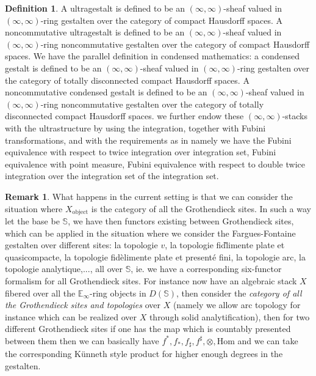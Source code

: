 \documentclass[12pt]{article}
\theoremstyle{definition}
\newtheorem{remark}{Remark}
\newtheorem{definition}{Definition}
\begin{document}
\begin{definition}
A ultragestalt is defined to be an $(\infty,\infty)$-sheaf valued in $(\infty,\infty)$-ring gestalten over the category of compact Hausdorff spaces. A noncommutative ultragestalt is defined to be an $(\infty,\infty)$-sheaf valued in $(\infty,\infty)$-ring noncommutative gestalten over the category of compact Hausdorff spaces. We have the parallel definition in condensed mathematics: a condensed gestalt is defined to be an $(\infty,\infty)$-sheaf valued in $(\infty,\infty)$-ring gestalten over the category of totally disconnected compact Hausdorff spaces. A noncommutative condensed gestalt is defined to be an $(\infty,\infty)$-sheaf valued in $(\infty,\infty)$-ring noncommutative gestalten over the category of totally disconnected compact Hausdorff spaces. we further endow these $(\infty,\infty)$-stacks with the ultrastructure by using the integration, together with Fubini transformations, and with the requirements as in \cite[Definition 1.3.1, (A), (B) (C)]{5Lu3} namely we have the Fubini equivalence with respect to twice integration over integration set, Fubini equivalence with point measure, Fubini equivalence with respect to double twice integration over the integration set of the integration set. 
\end{definition}



\begin{remark}
What happens in the current setting is that we can consider the situation where $X_\mathrm{object}$ is the category of all the Grothendieck sites. In such a way let the base be $\mathbb{S}$, we have then functors existing between Grothendieck sites, which can be applied in the situation where we consider the Fargues-Fontaine gestalten over different sites: la topologie $v$, la topologie fid\`limente plate et quasicompacte, la topologie fid\`elimente plate et present\'e fini, la topologie arc, la topologie analytique,..., all over $\mathbb{S}$, ie. we have a corresponding six-functor formalism for all Grothendieck sites. For instance now have an algebraic stack $X$ fibered over all the $\mathbb{E}_\infty$-ring objects in $D(\mathbb{S})$, then consider the \textit{category of all the Grothendieck sites and topologies} over $X$ (namely we allow arc topology for instance which can be realized over $X$ through solid analytification), then for two different Grothendieck sites if one has the map which is countably presented between them then we can basically have $f^*,f_*,f_\sharp,f^\sharp,\otimes, \mathrm{Hom}$ and we can take the corresponding K\"unneth style product for higher enough degrees in the gestalten. 
\end{remark}
\end{document}

